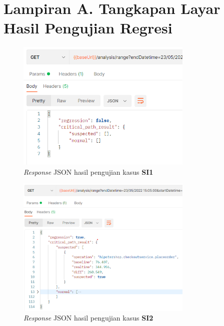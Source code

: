\chapter{Lampiran A. Tangkapan Layar Hasil Pengujian Regresi}
\label{lampiran_a}

\begin{figure}[!htb]
	\centering
	\includegraphics[width=0.75\textwidth]{resources/ch4/json/1-new.png}
	\caption{\textit{Response} JSON hasil pengujian kasus \textbf{SI1}}
	\label{result_json_1}
\end{figure}


\begin{figure}[!htb]
	\centering
	\includegraphics[width=0.75\textwidth]{resources/ch4/json/2-new.png}
	\caption{\textit{Response} JSON hasil pengujian kasus \textbf{SI2}}
	\label{result_json_2}
\end{figure}

